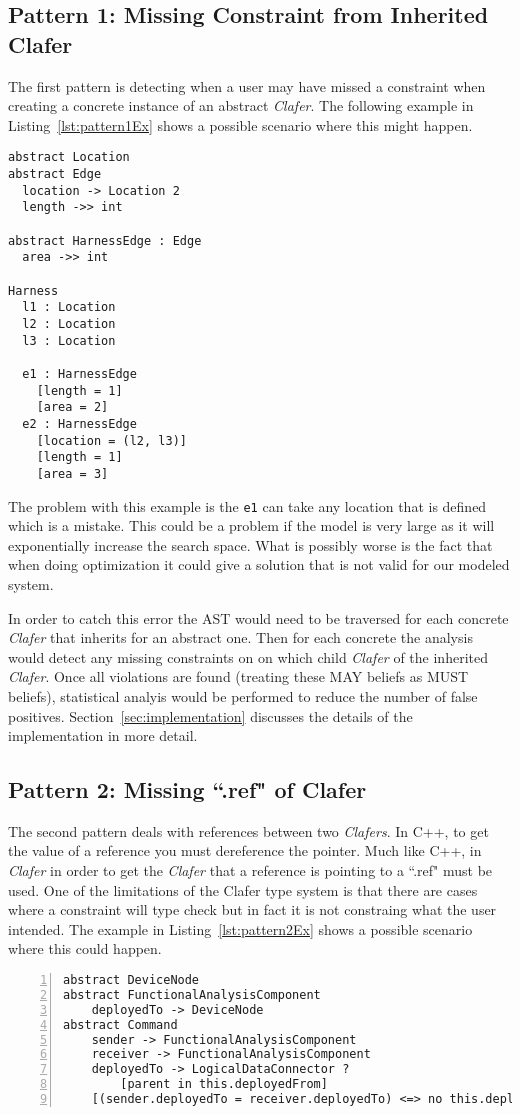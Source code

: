\documentclass[10pt,oneside]{IEEEtran}
\begin{document}
\subsection{Pattern 1: Missing Constraint from Inherited Clafer}
The first pattern is detecting when a user may have missed a constraint when creating a concrete instance of an abstract \textit{Clafer}. The following example in Listing~\ref{lst:pattern1Ex} shows a possible scenario where this might happen.
\begin{lstlisting}[label={lst:pattern1Ex},caption={Example of Pattern 1}]
abstract Location
abstract Edge
  location -> Location 2
  length ->> int

abstract HarnessEdge : Edge
  area ->> int

Harness
  l1 : Location
  l2 : Location
  l3 : Location

  e1 : HarnessEdge
    [length = 1]
    [area = 2]
  e2 : HarnessEdge
    [location = (l2, l3)]
    [length = 1]
    [area = 3]
\end{lstlisting}
The problem with this example is the \lstinline$e1$ can take any location that is defined which is a mistake. This could be a problem if the model is very large as it will exponentially increase the search space. What is possibly worse is the fact that when doing optimization it could give a solution that is not valid for our modeled system.

In order to catch this error the AST would need to be traversed for each concrete \textit{Clafer} that inherits for an abstract one. Then for each concrete the analysis would detect any missing constraints on on which child \textit{Clafer} of the inherited \textit{Clafer}. Once all violations are found (treating these MAY beliefs as MUST beliefs), statistical analyis would be performed to reduce the number of false positives. Section~\ref{sec:implementation} discusses the details of the implementation in more detail.

\subsection{Pattern 2: Missing ``.ref" of Clafer}
The second pattern deals with references between two \textit{Clafers}. In C++, to get the value of a reference you must dereference the pointer. Much like C++, in \textit{Clafer} in order to get the \textit{Clafer} that a reference is pointing to a ``.ref" must be used. One of the limitations of the Clafer type system is that there are cases where a constraint will type check but in fact it is not constraing what the user intended. The example in Listing~\ref{lst:pattern2Ex} shows a possible scenario where this could happen.
\begin{lstlisting}[label={lst:pattern2Ex},caption={Example of Pattern 2},numbers=left]
abstract DeviceNode
abstract FunctionalAnalysisComponent
    deployedTo -> DeviceNode
abstract Command
    sender -> FunctionalAnalysisComponent
    receiver -> FunctionalAnalysisComponent
    deployedTo -> LogicalDataConnector ?
        [parent in this.deployedFrom]
    [(sender.deployedTo = receiver.deployedTo) <=> no this.deployedTo]
\end{lstlisting}
\end{document}
